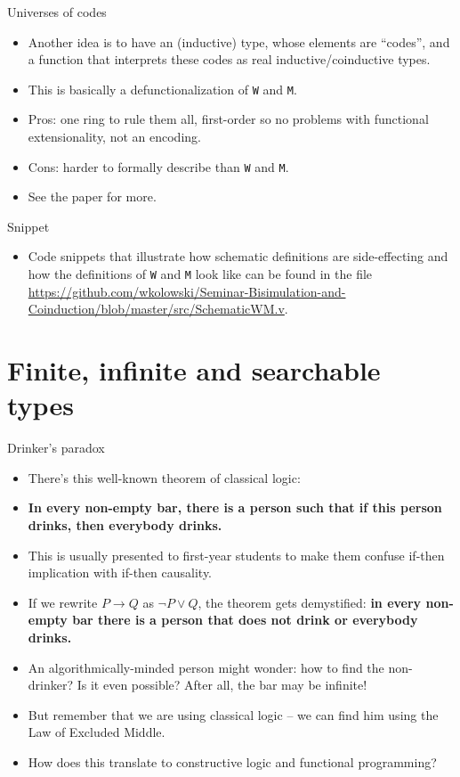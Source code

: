 \documentclass{beamer}
\begin{document}
\begin{frame}{Universes of codes}
\begin{itemize}
	\item Another idea is to have an (inductive) type, whose elements are ``codes'', and a function that interprets these codes as real inductive/coinductive types.
	\item This is basically a defunctionalization of \texttt{W} and \texttt{M}.
	\item Pros: one ring to rule them all, first-order so no problems with functional extensionality, not an encoding.
	\item Cons: harder to formally describe than \texttt{W} and \texttt{M}.
	\item See the paper \href{http://jmchapman.io/papers/levitation.pdf}{\color{blue}{The gentle art of levitation}} for more.
\end{itemize}
\end{frame}

\begin{frame}{Snippet}
\begin{itemize}
	\item Code snippets that illustrate how schematic definitions are side-effecting and how the definitions of \texttt{W} and \texttt{M} look like can be found in the file \url{https://github.com/wkolowski/Seminar-Bisimulation-and-Coinduction/blob/master/src/SchematicWM.v}.
\end{itemize}
\end{frame}

\section{Finite, infinite and searchable types}

\begin{frame}{Drinker's paradox}
\begin{itemize}
	\item There's this well-known theorem of classical logic:
	\item \textbf{In every non-empty bar, there is a person such that if this person drinks, then everybody drinks.}
	\item This is usually presented to first-year students to make them confuse if-then implication with if-then causality.
	\item If we rewrite $P \to Q$ as $\neg P \lor Q$, the theorem gets demystified: \textbf{in every non-empty bar there is a person that does not drink or everybody drinks.}
	\item An algorithmically-minded person might wonder: how to find the non-drinker? Is it even possible? After all, the bar may be infinite!
	\item But remember that we are using classical logic -- we can find him using the Law of Excluded Middle.
	\item How does this translate to constructive logic and functional programming?
\end{itemize}
\end{frame}
\end{document}

